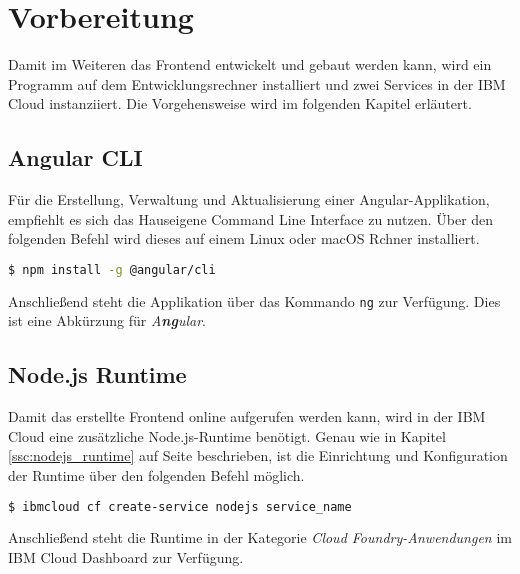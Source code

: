 \section{Vorbereitung}
Damit im Weiteren das Frontend entwickelt und gebaut werden kann, wird ein Programm auf dem Entwicklungsrechner
installiert und zwei Services in der IBM Cloud instanziiert. Die Vorgehensweise wird im folgenden Kapitel erläutert.

\subsection{Angular CLI}
Für die Erstellung, Verwaltung und Aktualisierung einer Angular-Applikation, empfiehlt es sich das Hauseigene Command
Line Interface zu nutzen. Über den folgenden Befehl wird dieses auf einem Linux oder macOS Rchner installiert.

\begin{lstlisting}[language=bash, caption=Installation des Angular CLI, label=Installation des Angular CLI]
$ npm install -g @angular/cli
\end{lstlisting}

Anschließend steht die Applikation über das Kommando \texttt{ng} zur Verfügung. Dies ist eine Abkürzung für
\textit{A\textbf{ng}ular}.

\subsection{Node.js Runtime}
Damit das erstellte Frontend online aufgerufen werden kann, wird in der IBM Cloud eine zusätzliche Node.js-Runtime
benötigt. Genau wie in Kapitel \ref{ssc:nodejs_runtime} auf Seite \pageref{ssc:nodejs_runtime} beschrieben, ist die
Einrichtung und Konfiguration der Runtime über den folgenden Befehl möglich.

\begin{lstlisting}[language=bash, caption=Instanziierung der Node.js Runtime, label=Instanziierung der Node.js Runtime]
$ ibmcloud cf create-service nodejs service_name
\end{lstlisting}

Anschließend steht die Runtime in der Kategorie \textit{Cloud Foundry-Anwendungen} im IBM Cloud Dashboard zur Verfügung.
